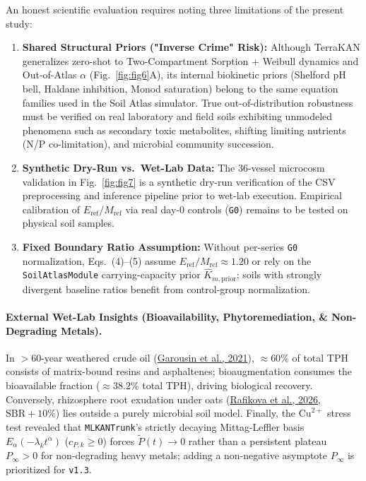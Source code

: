 \documentclass[10pt,twocolumn,a4paper]{article}
\begin{document}
An honest scientific evaluation requires noting three limitations of the present study:
\begin{enumerate}\setlength{\itemsep}{1pt}\setlength{\parskip}{0pt}
  \item \textbf{Shared Structural Priors ("Inverse Crime" Risk):} Although TerraKAN generalizes zero-shot to Two-Compartment Sorption + Weibull dynamics and Out-of-Atlas $\alpha$ (Fig.~\ref{fig:fig6}A), its internal biokinetic priors (Shelford pH bell, Haldane inhibition, Monod saturation) belong to the same equation families used in the Soil Atlas simulator. True out-of-distribution robustness must be verified on real laboratory and field soils exhibiting unmodeled phenomena such as secondary toxic metabolites, shifting limiting nutrients (N/P co-limitation), and microbial community succession.
  \item \textbf{Synthetic Dry-Run vs.\ Wet-Lab Data:} The 36-vessel microcosm validation in Fig.~\ref{fig:fig7} is a synthetic dry-run verification of the CSV preprocessing and inference pipeline prior to wet-lab execution. Empirical calibration of $E_{\text{ref}}/M_{\text{ref}}$ via real day-0 controls (\texttt{G0}) remains to be tested on physical soil samples.
  \item \textbf{Fixed Boundary Ratio Assumption:} Without per-series \texttt{G0} normalization, Eqs.~(4)--(5) assume $E_{\text{ref}}/M_{\text{ref}} \approx 1.20$ or rely on the \texttt{SoilAtlasModule} carrying-capacity prior $\hat{K}_{m,\mathrm{prior}}$; soils with strongly divergent baseline ratios benefit from control-group normalization.
\end{enumerate}


\paragraph{External Wet-Lab Insights (Bioavailability, Phytoremediation, \& Non-Degrading Metals).}
In $>60$-year weathered crude oil (\href{https://pmc.ncbi.nlm.nih.gov/articles/PMC7947215/}{Garousin et al., 2021}), $\approx 60\%$ of total TPH consists of matrix-bound resins and asphaltenes; bioaugmentation consumes the bioavailable fraction ($\approx 38.2\%$ total TPH), driving biological recovery. Conversely, rhizosphere root exudation under oats (\href{https://pmc.ncbi.nlm.nih.gov/articles/PMC12945044/}{Rafikova et al., 2026}, $\mathrm{SBR}+10\%$) lies outside a purely microbial soil model. Finally, the $\mathrm{Cu}^{2+}$ stress test revealed that \texttt{MLKANTrunk}'s strictly decaying Mittag-Leffler basis $E_\alpha(-\lambda_k t^\alpha)$ ($c_{P,k} \ge 0$) forces $\tilde{P}(t) \to 0$ rather than a persistent plateau $P_\infty > 0$ for non-degrading heavy metals; adding a non-negative asymptote $P_\infty$ is prioritized for \texttt{v1.3}.
\end{document}
